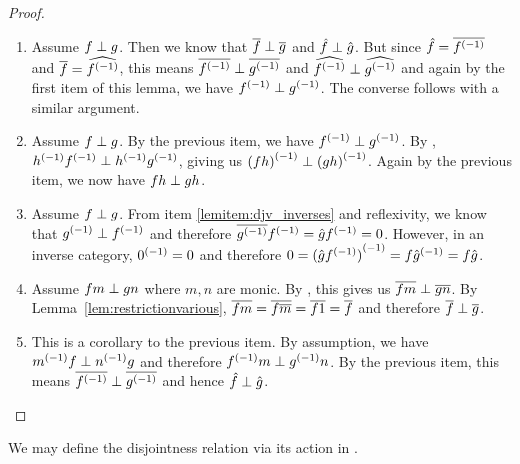 \begin{proof}
  \prepprooflist
  \begin{enumerate}[{(}i{)}]
    \item Assume $f \perp g$. Then we know that $\overline{f} \perp \overline{g}$ and
      $\hat{f}\perp\hat{g}$. But since $\hat{f} = \overline{{f}^{(-1)}}$ and $\overline{f} = \widehat{{f}^{(-1)}}$, this
      means $\overline{{f}^{(-1)}} \perp \overline{{g}^{(-1)}}$ and $\widehat{{f}^{(-1)}}\perp\widehat{{g}^{(-1)}}$ and again
      by the first item of this lemma, we have ${f}^{(-1)} \perp {g}^{(-1)}$. The converse follows with
      a similar argument.
    \item Assume $f \perp g$. By the previous item, we have ${f}^{(-1)}\perp{g}^{(-1)}$. By
      , ${h}^{(-1)}{f}^{(-1)}\perp{h}^{(-1)}{g}^{(-1)}$, giving us ${(f h)}^{(-1)} \perp
      {(g h)}^{(-1)}$. Again by the previous item, we now have $f h \perp g h$.
    \item Assume $f \perp g$. From item \ref{lemitem:djv_inverses} and reflexivity, we know that
      ${g}^{(-1)}
      \perp {f}^{(-1)}$ and therefore $\overline{{g}^{(-1)}}{f}^{(-1)} = \hat{g}{f}^{(-1)}= 0$. However, in an
      inverse category, ${0}^{(-1)} = 0$ and therefore $0 = {(\hat{g}{f}^{(-1)})}^{(-1)} = f {\hat{g}}^{(-1)} = f
      \hat{g}$.
    \item Assume $f m \perp g n$ where $m, n$ are monic. By , this gives us
      $\overline{f m} \perp \overline{g n}$. By Lemma~\ref{lem:restrictionvarious},
      $\overline{f m} = \overline{f \overline{m}} = \overline{f 1} = \overline{f}$ and therefore $\overline{f} \perp \overline{g}$.
    \item This is a corollary to the previous item. By assumption, we have ${m}^{(-1)} f \perp
      {n}^{(-1)}g$ and therefore ${f}^{(-1)}m \perp {g}^{(-1)} n$. By the previous item, this means
      $\overline{{f}^{(-1)}} \perp \overline{{g}^{(-1)}}$ and hence $\hat{f} \perp \hat{g}$.
  \end{enumerate}
\end{proof}

We may define the disjointness relation via its action in .

